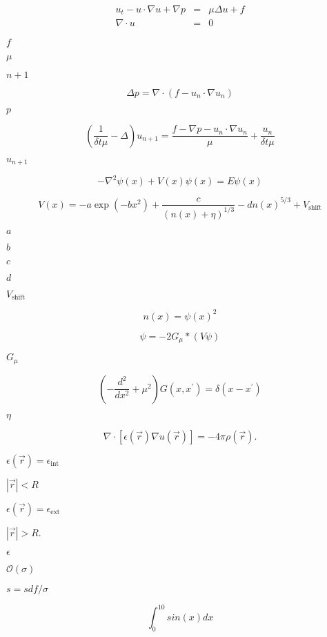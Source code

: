 \documentclass{article}
\begin{document}
\begin{eqnarray*} u_t - u \cdot \nabla u + \nabla p & = &\mu \Delta u + f \\ \nabla \cdot u & = & 0 \end{eqnarray*}
\pagebreak

$ f $
\pagebreak

$ \mu $
\pagebreak

$ n+1 $
\pagebreak

\[ \Delta p = \nabla \cdot (f - u_{n} \cdot \nabla u_{n} ) \]
\pagebreak

$p$
\pagebreak

\[ (\frac{1}{ \delta t \mu } - \Delta) u_{n+1} = \frac {f - \nabla p - u_n \cdot \nabla u_n }{ \mu } + \frac {u_n}{ \delta t \mu } \]
\pagebreak

$u_{n+1}$
\pagebreak

\[ -\nabla^2 \psi(x) + V(x) \psi(x) = E \psi(x) \]
\pagebreak

\[ V(x) = -a \exp(-b x^2) + \frac{c}{(n(x)+\eta)^{1/3}} - d n(x)^{5/3} + V_{\mbox{shift}} \]
\pagebreak

$ a $
\pagebreak

$ b $
\pagebreak

$ c $
\pagebreak

$ d $
\pagebreak

$ V_{\mbox{shift}} $
\pagebreak

\[ n(x) = \psi(x)^2 \]
\pagebreak

\[ \psi = - 2 G_{\mu} * \left ( V \psi \right) \]
\pagebreak

$ G_{\mu}$
\pagebreak

\[ \left( - \frac{d^2}{dx^2} + \mu^2 \right) G(x,x^{\prime}) = \delta(x-x^{\prime}) \]
\pagebreak

$ \eta $
\pagebreak

\[ \nabla \cdot{} \left[ \epsilon(\vec{r}) \nabla u(\vec{r}) \right] = - 4 \pi \rho(\vec{r}). \]
\pagebreak

$ \epsilon(\vec{r}) = \epsilon_\mathrm{int}$
\pagebreak

$ |\vec{r}| < R$
\pagebreak

$ \epsilon(\vec{r}) = \epsilon_\mathrm{ext}$
\pagebreak

$ |\vec{r}| > R.$
\pagebreak

$\epsilon$
\pagebreak

$\mathcal{O}(\sigma)$
\pagebreak

$s=sdf/\sigma$
\pagebreak

\[ \int_0^{10} sin(x) dx \]
\pagebreak
\end{document}

